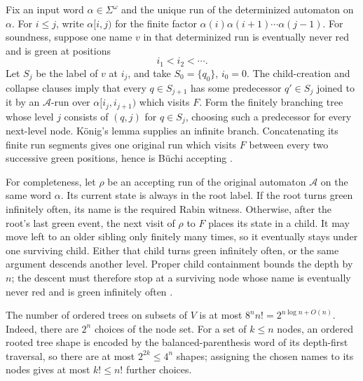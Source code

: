 Fix an input word \(\alpha\in\Sigma^\omega\) and the unique run of the
determinized automaton on \(\alpha\).  For \(i\le j\), write
\(\alpha[i,j)\) for the finite factor
\(\alpha(i)\alpha(i+1)\cdots\alpha(j-1)\).  For soundness, suppose one name
\(v\) in that determinized run is eventually never red and is green at
positions
\[
  i_1<i_2<\cdots.
\]
Let \(S_j\) be the label of \(v\) at \(i_j\), and take
\(S_0=\{q_0\}\), \(i_0=0\).  The child-creation and collapse clauses imply
that every \(q\in S_{j+1}\) has some predecessor \(q'\in S_j\) joined to it
by an \(\mathcal A\)-run over
\(\alpha[i_j,i_{j+1})\) which visits \(F\).  Form the finitely branching tree
whose level \(j\) consists of \((q,j)\) for \(q\in S_j\), choosing such a
predecessor for every next-level node.  K\"onig's lemma supplies an infinite
branch.  Concatenating its finite run segments gives one original run which
visits \(F\) between every two successive green positions, hence is B\"uchi
accepting
\cite[pp.~11--12]{Safra1995Extended}.

For completeness, let \(\rho\) be an accepting run of the original automaton
\(\mathcal A\) on the same word \(\alpha\).  Its current state is always in
the root label.  If the root turns green infinitely often,
its name is the required Rabin witness.  Otherwise, after the root's last green
event, the next visit of \(\rho\) to \(F\) places its state in a child.  It may
move left to an older sibling only finitely many times, so it eventually stays
under one surviving child.  Either that child turns green infinitely often, or
the same argument descends another level.  Proper child containment bounds the
depth by \(n\); the descent must therefore stop at a surviving node whose name
is eventually never red and is green infinitely often
\cite[p.~12]{Safra1995Extended}.

The number of ordered trees on subsets of \(V\) is at most
\(8^n n!=2^{n\log n+O(n)}\).  Indeed, there are \(2^n\) choices of the
node set.  For a set of \(k\le n\) nodes, an ordered rooted tree shape is
encoded by the balanced-parenthesis word of its depth-first traversal, so
there are at most \(2^{2k}\le4^n\) shapes; assigning the chosen names to its
nodes gives at most \(k!\le n!\) further choices.

